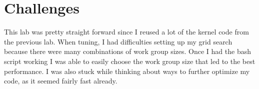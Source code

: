 \documentclass[12pt]{article}
\begin{document}
\section{Challenges}

This lab was pretty straight forward since I reused a lot of the kernel code from the previous lab.
When tuning, I had difficulties setting up my grid search because there were many combinations of work group sizes.
Once I had the bash script working I was able to easily choose the work group size that led to the best performance.
I was also stuck while thinking about ways to further optimize my code, as it seemed fairly fast already.
\end{document}
